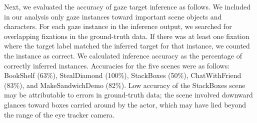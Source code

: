 Next, we evaluated the accuracy of gaze target inference as follows. We included in our analysis only gaze instances toward important scene objects and characters. For each gaze instance in the inference output, we searched for overlapping fixations in the ground-truth data. If there was at least one fixation where the target label matched the inferred target for that instance, we counted the instance as correct. We calculated inference accuracy as the percentage of correctly inferred instances. Accuracies for the five scenes were as follows: BookShelf (63\%), StealDiamond (100\%), StackBoxes (50\%), ChatWithFriend (83\%), and MakeSandwichDemo (82\%). Low accuracy of the StackBoxes scene may be attributable to errors in ground-truth data; the scene involved downward glances toward boxes carried around by the actor, which may have lied beyond the range of the eye tracker camera.
